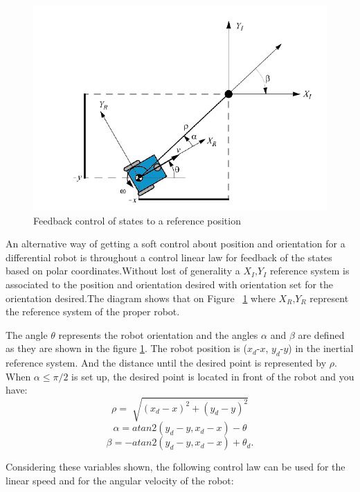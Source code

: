\documentclass[conference]{IEEEtran}
\begin{document}
\begin{figure}[h]
  \includegraphics[width=0.9\linewidth]{control_polar.png}
  \centering\caption{Feedback control of states to a reference position}
  \label{fig:Polar}
\end{figure}

An alternative way of getting a soft control about position and orientation for a differential robot is throughout a control linear law for feedback  of the states based on polar coordinates.Without lost of generality a $\textbf{$X_{I}$,$Y_{I}$}$ reference system is associated to the position and orientation desired with orientation  set for the orientation desired.The diagram shows that on Figure ~\ref{fig:Polar} where $\textbf{$X_{R}$,$Y_{R}$}$ represent the reference system of the proper robot.

The angle $\theta$ represents the robot orientation and the angles $\alpha$ and $\beta$ are defined as they are shown in the figure \ref{fig:Polar}. The robot position is ($x_{d}$-$x$, $y_{d}$-$y$) in the inertial reference system. And the distance until the desired point is represented by $\rho$. When $\alpha \leq \pi/2 $ is set up, the desired point is located in front of the robot and you have:
\begin{equation}
	\rho = \sqrt[]{(x_{d} - x)^2 + (y_{d} - y)^2} 
\end{equation}
\begin{equation}
	\alpha = atan2(y_{d} - y, x_{d} - x) - \theta 
\end{equation}
\begin{equation}
	\beta = -atan2(y_{d} - y, x_{d} - x) + \theta_{d}.
\end{equation}

Considering these variables shown, the following control law can be used for the linear speed and for the angular velocity of the robot:
\end{document}
